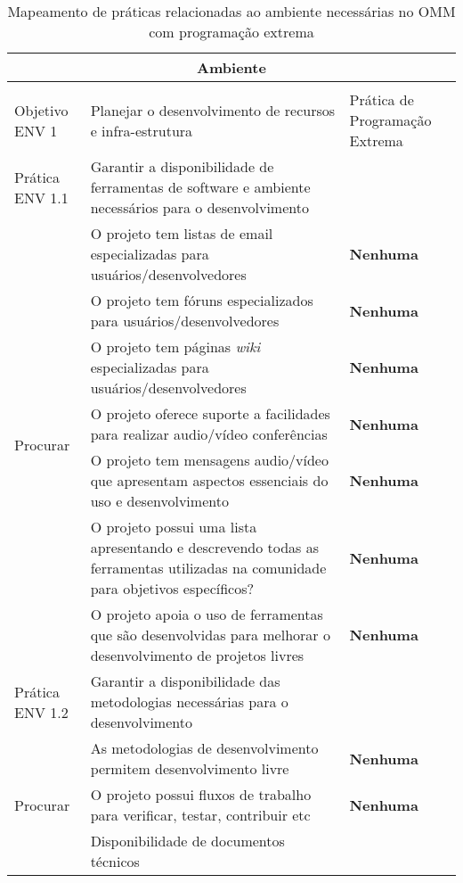 \begin{longtable}{|p{2cm}|p{7cm}|p{7cm}|}
  \caption{Mapeamento de práticas relacionadas ao ambiente necessárias
    no OMM com programação extrema} \\
  \multicolumn{3}{|c|}{\cellcolor[gray]{0.6} Ambiente}\\
  \endhead
  & & \\
  \hline \cellcolor[gray]{0.6} Objetivo ENV 1 & \cellcolor[gray]{0.6}
  Planejar o desenvolvimento de recursos e infra-estrutura & Prática
  de Programação Extrema \\
  \hline \cellcolor[gray]{0.9} Prática ENV 1.1 & \cellcolor[gray]{0.9}
  Garantir a disponibilidade de ferramentas de software e ambiente
  necessários para o desenvolvimento & \\
  \hline \multirow{7}{*}{Procurar} & O projeto tem listas de email
  especializadas para usuários/desenvolvedores &\textbf{Nenhuma} \\
  \cline{2-3} & O projeto tem fóruns
  especializados para usuários/desenvolvedores &\textbf{Nenhuma} \\
  \cline{2-3} & O projeto tem páginas \textit{wiki}
  especializadas para usuários/desenvolvedores &\textbf{Nenhuma} \\
  \cline{2-3} & O projeto oferece suporte a facilidades para realizar
  audio/vídeo conferências &\textbf{Nenhuma} \\
  \cline{2-3} & O projeto tem mensagens audio/vídeo que apresentam
  aspectos essenciais do uso e desenvolvimento &\textbf{Nenhuma} \\
  \cline{2-3} & O projeto possui uma lista apresentando e descrevendo
  todas as ferramentas utilizadas na comunidade para objetivos
  específicos? &\textbf{Nenhuma} \\
  \cline{2-3} & O projeto apoia o uso de ferramentas que são
  desenvolvidas para melhorar o desenvolvimento de projetos livres
  &\textbf{Nenhuma} \\
  \hline \cellcolor[gray]{0.9} Prática ENV 1.2 & \cellcolor[gray]{0.9}
  Garantir a disponibilidade das metodologias necessárias para o
  desenvolvimento & \\
  \hline \multirow{3}{*}{Procurar} & As metodologias de
  desenvolvimento permitem desenvolvimento livre  & \textbf{Nenhuma} \\
  \cline{2-3} & O projeto possui fluxos de trabalho para verificar,
  testar, contribuir etc & \textbf{Nenhuma} \\
  \cline{2-3} & Disponibilidade de documentos técnicos &

\end{longtable}
